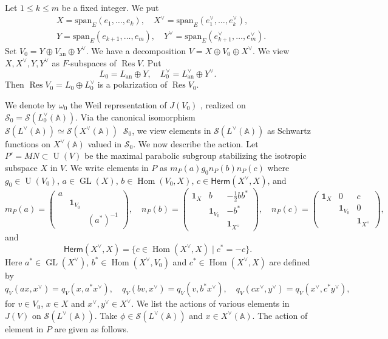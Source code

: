 \documentclass[letterpaper,11pt]{amsart}
\newcommand{\bA}{\mathbb{A}}
\newcommand{\cS}{\mathcal{S}}
\newcommand{\<}{\negthickspace}
\newcommand{\herm}{\mathsf{Herm}}
\DeclareMathOperator{\GL}{GL}
\DeclareMathOperator{\U}{U}
\DeclareMathOperator{\Res}{Res}
\DeclareMathOperator{\Hom}{Hom}
\DeclareMathOperator{\id}{\mathbf{1}}
\DeclareMathOperator{\otimeshat}{\widehat{\otimes}}
\theoremstyle{definition}
\theoremstyle{plain}
\theoremstyle{remark}
\numberwithin{equation}{section}
\begin{document}
Let $1\leq k \leq m$ be a fixed integer. We put
\begin{align*}
     &X = \mathrm{span}_E(e_1, \hdots, e_k), \quad
    X^\vee =\mathrm{span}_E(e_1^\vee, \hdots, e_k^\vee), \\
    & Y = \mathrm{span}_E(e_{k+1}, \hdots, e_m), \quad
    Y^\vee =\mathrm{span}_E(e_{k+1}^\vee, \hdots, e_m^\vee ).
\end{align*}
Set $V_0 =Y \oplus V_{\mathrm{an}} \oplus Y^\vee$. We have a decomposition $V =
X \oplus V_0 \oplus X^\vee$. We view $X, X^\vee, Y, Y^\vee$
as $F$-subspaces of $\Res V$. Put
    \[
    L_0 = L_{\mathrm{an}} \oplus Y, \quad
    L_0^\vee = L_{\mathrm{an}}^\vee \oplus Y^\vee .
    \]
Then $\Res V_0 = L_0 \oplus L_0^\vee$ is a polarization of $\Res V_0$.

We denote by $\omega_{0}$ the Weil representation of $J(V_0)$ , realized on
$\cS_{0} = \cS(L_0^\vee(\bA))$. Via the canonical isomorphism
$\cS(L^\vee(\bA)) \simeq \cS(X^\vee(\bA)) \otimeshat \cS_0$, we view elements in
$\cS(L^\vee(\bA))$ as Schwartz functions on $X^\vee(\bA)$
valued in $\cS_0$. We now describe the action. Let $P'= M N \subset \U(V)$
be the maximal parabolic subgroup stabilizing the isotropic subspace $X$ in
$V$. We write elements in $P$ as $m_P(a) g_0  n_P(b) n_P(c)$ where $g_0 \in
\U(V_0)$, $a \in \GL(X)$, $b \in \Hom(V_0, X)$, $c \in \herm(X^\vee, X)$, and
    \[
    m_P(a) = \begin{pmatrix} a \\ & \id_{V_0} \\ && (a^*)^{-1} \end{pmatrix},
    \quad
    n_P(b) = \begin{pmatrix} \id_X & b & -\frac{1}{2} b b^* \\
    & \id_{V_0} & -b^* \\ && \id_{X^\vee} \end{pmatrix},
    \quad
    n_P(c) = \begin{pmatrix} \id_X & 0 &c \\ & \id_{V_0} & 0 \\
    && \id_{X^\vee} \end{pmatrix},
    \]
and
    \[
    \herm(X^\vee, X) = \{ c \in \Hom(X^\vee, X) \mid c^* = -c \}.
    \]
Here $a^* \in \GL(X^\vee)$, $b^* \in \Hom(X^\vee, V_0)$ and $c^* \in
\Hom(X^\vee, X)$ are defined by
    \[
    q_V(ax, x^\vee) = q_V(x, a^* x^\vee), \quad
    q_V(b v, x^\vee) = q_V(v, b^* x^\vee), \quad
    q_V(c x^\vee, y^\vee) = q_V(x^\vee, c^* y^\vee),
    \]
for $v \in V_0$, $x \in X$ and $x^\vee, y^\vee \in X^\vee$. We list
the actions of various elements in $J(V)$ on $\cS(L^\vee(\bA))$. Take $\phi
\in \cS(L^\vee(\bA))$ and $x \in X^\vee(\bA)$. The action of element in $P$
are given as follows.
\end{document}
